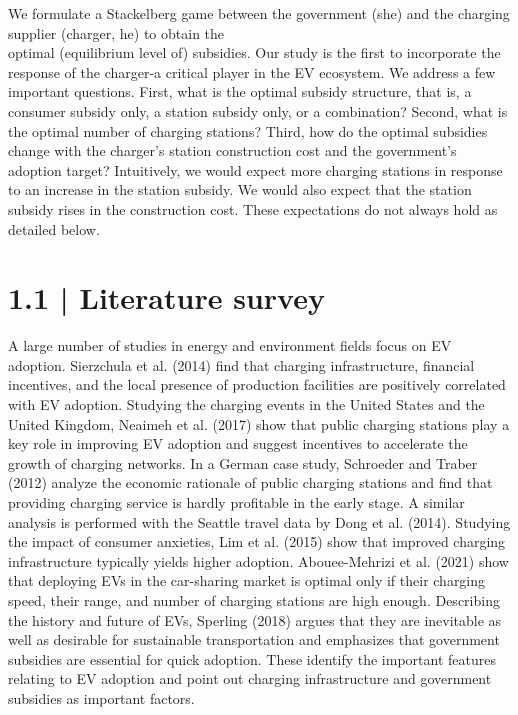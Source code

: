 \documentclass[10pt]{article}
\begin{document}
We formulate a Stackelberg game between the government (she) and the charging supplier (charger, he) to obtain the\\
optimal (equilibrium level of) subsidies. Our study is the first to incorporate the response of the charger-a critical player in the EV ecosystem. We address a few important questions. First, what is the optimal subsidy structure, that is, a consumer subsidy only, a station subsidy only, or a combination? Second, what is the optimal number of charging stations? Third, how do the optimal subsidies change with the charger's station construction cost and the government's adoption target? Intuitively, we would expect more charging stations in response to an increase in the station subsidy. We would also expect that the station subsidy rises in the construction cost. These expectations do not always hold as detailed below.

\section*{1.1 | Literature survey}
A large number of studies in energy and environment fields focus on EV adoption. Sierzchula et al. (2014) find that charging infrastructure, financial incentives, and the local presence of production facilities are positively correlated with EV adoption. Studying the charging events in the United States and the United Kingdom, Neaimeh et al. (2017) show that public charging stations play a key role in improving EV adoption and suggest incentives to accelerate the growth of charging networks. In a German case study, Schroeder and Traber (2012) analyze the economic rationale of public charging stations and find that providing charging service is hardly profitable in the early stage. A similar analysis is performed with the Seattle travel data by Dong et al. (2014). Studying the impact of consumer anxieties, Lim et al. (2015) show that improved charging infrastructure typically yields higher adoption. Abouee-Mehrizi et al. (2021) show that deploying EVs in the car-sharing market is optimal only if their charging speed, their range, and number of charging stations are high enough. Describing the history and future of EVs, Sperling (2018) argues that they are inevitable as well as desirable for sustainable transportation and emphasizes that government subsidies are essential for quick adoption. These identify the important features relating to EV adoption and point out charging infrastructure and government subsidies as important factors.
\end{document}
